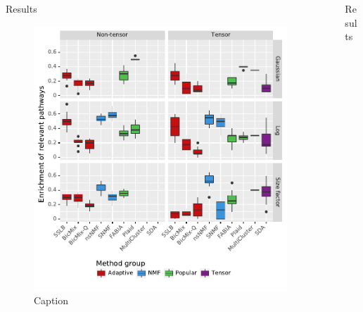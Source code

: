 \documentclass[final]{beamer}
\newlength{\sepwid}
\newlength{\onecolwid}
\begin{document}
\begin{frame}[t]
\begin{columns}[t]
\begin{column}{\onecolwid}
\begin{block}{Results}
\begin{figure}
\includegraphics[width=0.9 \textwidth]{plots/compare_samegenes_K_50_datasets_ko_traits_nz_alpha_0-05.pdf}
\caption{Caption}
\end{figure}

\end{block}

\end{column} %

\begin{column}{\sepwid}\end{column} %
\begin{column}{\onecolwid} %


\begin{block}{Results}



\end{block}
\end{column}
\end{columns}
\end{frame}
\end{document}

